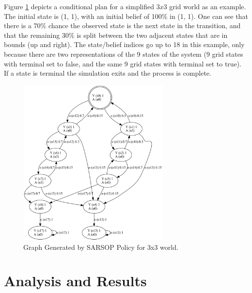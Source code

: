 \documentclass{article}
\begin{document}


Figure \ref{fig:gengraph} depicts a conditional plan for a simplified $3x3$ grid world as an example. The initial state is (1, 1), with an initial belief of 100$\%$ in (1, 1). One can see that there is a 70$\%$ chance the observed state is the next state in the transition, and that the remaining 30$\%$ is split between the two adjacent states that are in bounds (up and right). The state/belief indices go up to 18 in this example, only because there are two representations of the 9 states of the system (9 grid states with terminal set to false, and the same 9 grid states with terminal set to true). If a state is terminal the simulation exits and the process is complete.

\begin{figure}[H]
    \centering
    \includegraphics[width=3in]{gengraph.png}
    \caption{Graph Generated by SARSOP Policy for 3x3 world.}
    \label{fig:gengraph}
\end{figure}



\section*{Analysis and Results}
\end{document}
